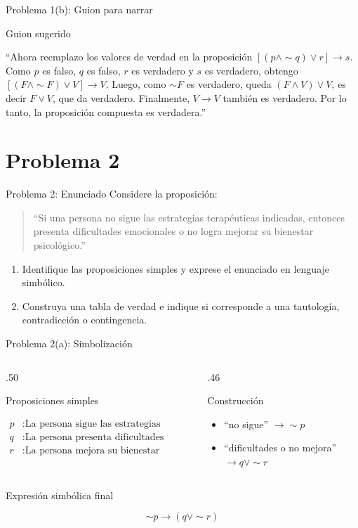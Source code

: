 \documentclass[aspectratio=169,11pt]{beamer}
\newcommand{\BloqueVisual}[2]{
	\begin{block}{#1}
		#2
	\end{block}
}
\newcommand{\BloqueGuion}[1]{
	\begin{exampleblock}{Guion sugerido}
		#1
	\end{exampleblock}
}
\begin{document}
	\begin{frame}{Problema 1(b): Guion para narrar}
		\BloqueGuion{
			``Ahora reemplazo los valores de verdad en la proposición \([(p\land \sim q)\lor r]\to s\). Como \(p\) es falso, \(q\) es falso, \(r\) es verdadero y \(s\) es verdadero, obtengo \([(F\land \sim F)\lor V]\to V\). Luego, como \(\sim F\) es verdadero, queda \((F\land V)\lor V\), es decir \(F\lor V\), que da verdadero. Finalmente, \(V\to V\) también es verdadero. Por lo tanto, la proposición compuesta es verdadera.''}
	\end{frame}
	
	\section{Problema 2}
	
	\begin{frame}{Problema 2: Enunciado}
		Considere la proposición:
		
		\begin{quote}
			``Si una persona no sigue las estrategias terapéuticas indicadas, entonces presenta dificultades emocionales o no logra mejorar su bienestar psicológico.''
		\end{quote}
		
		\begin{enumerate}
			\item[a)] Identifique las proposiciones simples y exprese el enunciado en lenguaje simbólico.
			\item[b)] Construya una tabla de verdad e indique si corresponde a una tautología, contradicción o contingencia.
		\end{enumerate}
	\end{frame}
	
	\begin{frame}{Problema 2(a): Simbolización}
		\begin{columns}[T]
			\begin{column}{.50\textwidth}
				\BloqueVisual{Proposiciones simples}{
					\begin{align*}
						p &: \text{La persona sigue las estrategias terapéuticas}\\
						q &: \text{La persona presenta dificultades emocionales}\\
						r &: \text{La persona mejora su bienestar psicológico}
					\end{align*}
				}
			\end{column}
			\begin{column}{.46\textwidth}
				\BloqueVisual{Construcción}{
					\begin{itemize}
						\item ``no sigue'' $\to \sim p$
						\item ``dificultades o no mejora'' $\to q\lor \sim r$
					\end{itemize}
				}
			\end{column}
		\end{columns}
		
		\BloqueVisual{Expresión simbólica final}{
			\[
			\sim p \to (q\lor \sim r)
			\]
		}
	\end{frame}
	
\end{document}
